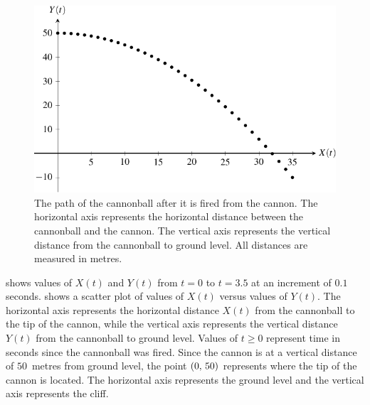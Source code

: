 \documentclass[a4paper,oneside,12pt]{article}
\begin{document}
\begin{problem}
{\begin{solution}
\begin{table}[!htbp]
\centering

\caption{%
  The path of the cannonball after it is fired from the cannon.
  Values of $X(t)$ give the horizontal distances~(metres) from the
  cannonball to the tip of the cannon at $t$ seconds after being
  fired.  Similarly, values of $Y(t)$ represent the vertical
  distances~(metres) from the cannonball to ground level at $t$
  seconds after being fired.  Some values in the right-most column
  have been rounded to three decimal places.
}
\label{tab:trigonometric:cannon_cliff_path}
\end{table}

\begin{figure}[!htbp]
\centering
\includegraphics[scale=1.1]{image/13/cannonball-trajectory.pdf}
\caption{%
  The path of the cannonball after it is fired from the cannon.  The
  horizontal axis represents the horizontal distance between the
  cannonball and the cannon.  The vertical axis represents the
  vertical distance from the cannonball to ground level.  All
  distances are measured in metres.
}
\label{fig:trigonometric:cannon_cliff_trajectory}
\end{figure}

 shows values of $X(t)$ and
$Y(t)$ from $t = 0$ to $t = 3.5$ at an increment of $0.1$ seconds.
 shows a scatter
plot of values of $X(t)$ versus values of $Y(t)$.  The horizontal axis
represents the horizontal distance $X(t)$ from the cannonball to the
tip of the cannon, while the vertical axis represents the vertical
distance $Y(t)$ from the cannonball to ground level.  Values of
$t \geq 0$ represent time in seconds since the cannonball was fired.
Since the cannon is at a vertical distance of $50$~metres from ground
level, the point $\left\lparen{0},\, {50}\right\rparen$ represents where the tip of the
cannon is located.  The horizontal axis represents the ground level
and the vertical axis represents the cliff.


\end{solution}}
\end{problem}
\end{document}

